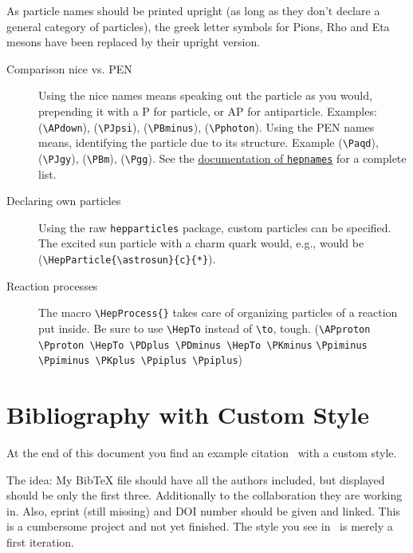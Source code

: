 As particle names should be printed upright (as long as they don't declare a general category of particles), the greek letter symbols for Pions, Rho and Eta mesons have been replaced by their upright version.
\begin{description}
	\item[Comparison nice vs. PEN] Using the nice names means speaking out the particle as you would, prepending it with a P for particle, or AP for antiparticle. Examples: \APdown (\verb|\APdown|), \PJpsi (\verb|\PJpsi|), \PBminus (\verb|\PBminus|), \Pphoton (\verb|\Pphoton|).\newline
	Using the PEN names means, identifying the particle due to its structure. Example \Paqd (\verb|\Paqd|), \PJgy (\verb|\PJgy|), \PBm (\verb|\PBm|), \Pgg (\verb|\Pgg|).\newline
	See the \href{http://ftp.gwdg.de/pub/ctan/macros/latex/contrib/hepnames/hepnames.pdf}{documentation of \texttt{hepnames}} for a complete list.
	\item[Declaring own particles] Using the raw \texttt{hepparticles} package, custom particles can be specified. The excited sun particle with a charm quark would, e.g., would be \xspace (\verb|\HepParticle{\astrosun}{c}{*}|).
	\item[Reaction processes] The macro \verb|\HepProcess{}| takes care of organizing particles of a reaction put inside. Be sure to use \verb|\HepTo| instead of \verb|\to|, tough.\newline
	\HepProcess{\APproton \Pproton \HepTo \PDplus \PDminus \HepTo \PKminus \Ppiminus \Ppiminus \PKplus \Ppiplus \Ppiplus}\newline
	(\verb|\APproton \Pproton \HepTo \PDplus \PDminus \HepTo \PKminus|\newline
	\verb|\Ppiminus \Ppiminus \PKplus \Ppiplus \Ppiplus|)
\end{description}

\section{Bibliography with Custom Style} %
\label{sec:bibliography_with_custom_style}
At the end of this document you find an example citation~\cite{panda:stttdr_epja} with a custom style.

The idea: My BibTeX file should have all the authors included, but displayed should be only the first three. Additionally to the collaboration they are working in. Also, eprint (still missing) and DOI number should be given and linked. This is a cumbersome project and not yet finished. The style you see in~\cite{panda:stttdr_epja} is merely a first iteration.

